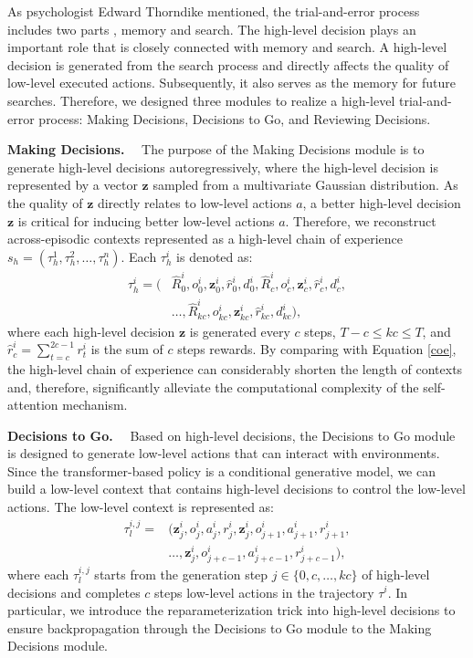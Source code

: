 As psychologist Edward Thorndike mentioned, the trial-and-error process includes two parts \cite{16}, memory and search. The high-level decision plays an important role that is closely connected with memory and search. A high-level decision is generated from the search process and directly affects the quality of low-level executed actions. Subsequently, it also serves as the memory for future searches. Therefore, we designed three modules to realize a high-level trial-and-error process: Making Decisions, Decisions to Go, and Reviewing Decisions.

\noindent\textbf{Making Decisions.}~~
The purpose of the Making Decisions module is to generate high-level decisions autoregressively, where the high-level decision is represented by a vector $\textbf{z}$ sampled from a multivariate Gaussian distribution. As the quality of $\textbf{z}$ directly relates to low-level actions $a$, a better high-level decision $\textbf{z}$ is critical for inducing better low-level actions $a$. Therefore, we reconstruct across-episodic contexts represented as a high-level chain of experience $s_h=(\tau_h^{1},\tau_h^{2},\dots,\tau_h^{n})$. Each $\tau_h^{i}$ is denoted as:
\begin{equation}
\begin{aligned}
\tau_h^{i}=(&\hat{R}_0^i,o_0^i,\textbf{z}_0^i,\hat{r}_0^i,d_0^i,\hat{R}_{c}^i,o_{c}^i,\textbf{z}_{c}^i,\hat{r}_{c}^i,d_{c}^i,\\
&\dots,\hat{R}_{kc}^i,o_{kc}^i,\textbf{z}_{kc}^i,\hat{r}_{kc}^i,d_{kc}^i),
\label{hcoe}
\end{aligned}
\end{equation}
where each high-level decision $\textbf{z}$ is generated every $c$ steps, $T-c\leq kc \leq T$, and $\hat{r}_c^i=\sum_{t=c}^{2c-1}{r_t^i}$ is the sum of $c$ steps rewards. By comparing with Equation \eqref{coe}, the high-level chain of experience can considerably shorten the length of contexts and, therefore, significantly alleviate the computational complexity of the self-attention mechanism.

\noindent\textbf{Decisions to Go.}~~
Based on high-level decisions, the Decisions to Go module is designed to generate low-level actions that can interact with environments. Since the transformer-based policy is a conditional generative model, we can build a low-level context that contains high-level decisions to control the low-level actions. The low-level context is represented as:
\begin{equation}
\begin{aligned}
\tau_l^{i,j}=&(\textbf{z}_j^i,o_j^i,a_j^i,r_j^i, \textbf{z}_{j}^i,o_{j+1}^i,a_{j+1}^i,r_{j+1}^i, \\ &\dots,\textbf{z}_{j}^i,o_{j+c-1}^i,a_{j+c-1}^i,r_{j+c-1}^i),
\label{lcoe}
\end{aligned}
\end{equation}
where each $\tau_l^{i,j}$ starts from the generation step $j\in\{0,c,\dots,kc\}$ of high-level decisions and completes $c$ steps low-level actions in the trajectory $\tau^i$. In particular, we introduce the reparameterization trick \cite{20} into high-level decisions to ensure backpropagation through the Decisions to Go module to the Making Decisions module. 

